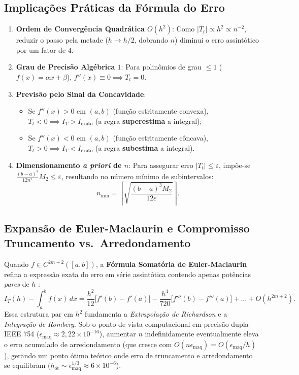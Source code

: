 \documentclass[11pt,a4paper]{article}
\begin{document}
\subsection{Implicações Práticas da Fórmula do Erro}
\begin{enumerate}[leftmargin=1.5em]
    \item \textbf{Ordem de Convergência Quadrática $O(h^2)$}: Como $|T_t| \propto h^2 \propto n^{-2}$, reduzir o passo pela metade ($h \to h/2$, dobrando $n$) diminui o erro assintótico por um fator de $4$.
    \item \textbf{Grau de Precisão Algébrica $1$}: Para polinômios de grau $\le 1$ ($f(x) = \alpha x + \beta$), $f''(x) \equiv 0 \implies T_t = 0$.
    \item \textbf{Previsão pelo Sinal da Concavidade}:
    \begin{itemize}
        \item Se $f''(x) > 0$ em $(a, b)$ (função estritamente convexa), $T_t < 0 \implies I_T > I_{\text{exato}}$ (a regra \textbf{superestima} a integral);
        \item Se $f''(x) < 0$ em $(a, b)$ (função estritamente côncava), $T_t > 0 \implies I_T < I_{\text{exato}}$ (a regra \textbf{subestima} a integral).
    \end{itemize}
    \item \textbf{Dimensionamento \emph{a priori} de $n$}: Para assegurar erro $|T_t| \le \varepsilon$, impõe-se $\frac{(b-a)^3}{12 n^2} M_2 \le \varepsilon$, resultando no número mínimo de subintervalos:
    \begin{equation}
        n_{\min} = \left\lceil \sqrt{\frac{(b - a)^3 M_2}{12 \varepsilon}} \right\rceil.
    \end{equation}
\end{enumerate}

\subsection{Expansão de Euler-Maclaurin e Compromisso Truncamento vs.\ Arredondamento}
Quando $f \in C^{2m+2}([a, b])$, a \textbf{Fórmula Somatória de Euler-Maclaurin} refina a expressão exata do erro em série assintótica contendo apenas potências \emph{pares} de $h$ \cite{burden2016}:
\begin{equation}
    I_T(h) - \int_a^b f(x)\,dx = \frac{h^2}{12}\big[f'(b) - f'(a)\big] - \frac{h^4}{720}\big[f'''(b) - f'''(a)\big] + \dots + O(h^{2m+2}).
\end{equation}
Essa estrutura par em $h^2$ fundamenta a \emph{Extrapolação de Richardson} e a \emph{Integração de Romberg}. Sob o ponto de vista computacional em precisão dupla IEEE 754 ($\epsilon_{\text{maq}} \approx 2{,}22 \times 10^{-16}$), aumentar $n$ indefinidamente eventualmente eleva o erro acumulado de arredondamento (que cresce com $O(n \epsilon_{\text{maq}}) = O(\epsilon_{\text{maq}}/h)$), gerando um ponto ótimo teórico onde erro de truncamento e arredondamento se equilibram ($h_{\text{ót}} \sim \epsilon_{\text{maq}}^{1/3} \approx 6 \times 10^{-6}$).
\end{document}

